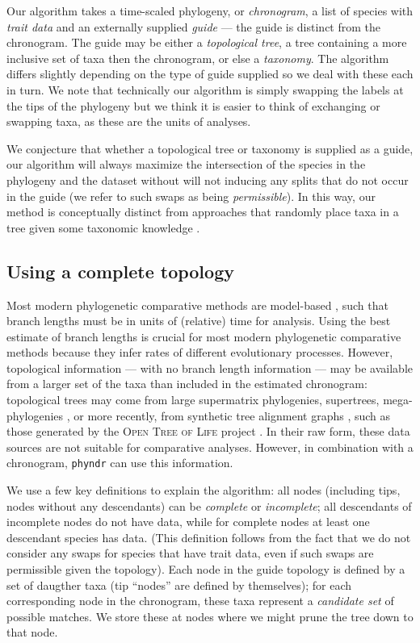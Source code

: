 \documentclass[a4paper,11pt]{article}
\newcommand{\phyndr}{\tt phyndr}
\begin{document}
Our algorithm takes a time-scaled phylogeny, or \emph{chronogram}, a list of species with \emph{trait data} and an externally supplied \emph{guide} --- the guide is distinct from the chronogram. The guide may be either a \emph{topological tree}, a tree containing a more inclusive set of taxa then the chronogram, or else a \emph{taxonomy}. The algorithm differs slightly depending on the type of guide supplied so we deal with these each in turn. We note that technically our algorithm is simply swapping the labels at the tips of the phylogeny but we think it is easier to think of exchanging or swapping taxa, as these are the units of analyses.

We conjecture that whether a topological tree or taxonomy is supplied as a guide, our algorithm will always maximize the intersection of the species in the phylogeny and the dataset without will not inducing any splits that do not occur in the guide (we refer to such swaps as being \emph{permissible}). In this way, our method is conceptually distinct from approaches that randomly place taxa in a tree given some taxonomic knowledge \citep{Kuhn2011, Jetz2012, ThomasPastis}. 

\subsection{Using a complete topology}

Most modern phylogenetic comparative methods are model-based \citep[see recent reviews by][]{omeara-2012, PennellHarmon}, such that branch lengths must be in units of (relative) time for analysis. Using the best estimate of branch lengths is crucial for most modern phylogenetic comparative methods because they infer rates of different evolutionary processes.  However, topological information --- with no branch length information --- may be available from a larger set of the taxa than included in the estimated chronogram: topological trees may come from large supermatrix phylogenies, supertrees, mega-phylogenies \citep[\emph{sensu}][]{Smithmega}, or more recently, from synthetic tree alignment graphs \citep{Smith2013}, such as those generated by the \textsc{Open Tree of Life} project \citep{OpenTree}. In their raw form, these data sources are not suitable for comparative analyses. However, in combination with a chronogram, {\phyndr} can use this information.   

We use a few key definitions to explain the algorithm: all nodes (including tips, nodes without any descendants) can be \emph{complete} or \emph{incomplete}; all descendants of incomplete nodes do not have data, while for complete nodes at least one descendant species has data.  (This definition follows from the fact that we do not consider any swaps for species that have trait data, even if such swaps are permissible given the topology). Each node in the guide topology is defined by a set of daugther taxa (tip ``nodes'' are defined by themselves); for each corresponding node in the chronogram, these taxa represent a \emph{candidate set} of possible matches. We store these at nodes where we might prune the tree down to that node.  
\end{document}
